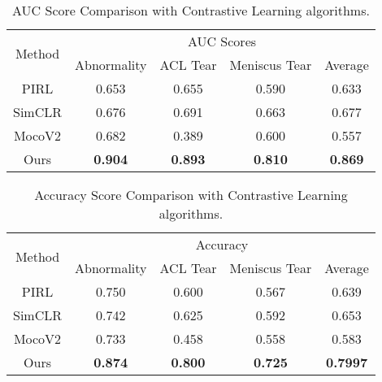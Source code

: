 \documentclass[journal]{IEEEtai}
\begin{document}
\begin{table}[!ht]
    \centering
\centering
    \bgroup
    \caption{AUC Score Comparison with Contrastive Learning algorithms. }
    \label{tab:contr_comp_auc}
    \def\arraystretch{1.5}
    \begin{tabular}{c|c|c|c|c}
    \hline
        \multirow{2}{1.2cm}{\centering Method} & \multicolumn{4}{c}{\centering AUC Scores}\\ \cline{2-5}
        {} & Abnormality & ACL Tear & Meniscus Tear & Average\\  
        \hline \hline
        PIRL \cite{pirl} & 0.653 & 0.655 & 0.590 & 0.633\\ \hline
        SimCLR \cite{simclr} & 0.676 & 0.691 & 0.663 & 0.677\\ \hline
        MocoV2 \cite{mocov2} & 0.682 & 0.389 & 0.600 & 0.557\\ \hline
Ours & \textbf{0.904} & \textbf{0.893} & \textbf{0.810} & \textbf{0.869}\\\hline
         
    \end{tabular}
    \egroup


\end{table}
\quad
\begin{table}[!ht]
\centering
    \bgroup
    \caption{Accuracy Score Comparison with Contrastive Learning algorithms. }
    \label{tab:contr_comp_acc}
    \def\arraystretch{1.5}
    \begin{tabular}{c|c|c|c|c}
    \hline
        \multirow{2}{1.2cm}{\centering Method} & \multicolumn{4}{c}{\centering Accuracy}\\ \cline{2-5}
        {} & Abnormality & ACL Tear & Meniscus Tear & Average\\  
        \hline \hline
        PIRL \cite{pirl} & 0.750 & 0.600 & 0.567 & 0.639\\ \hline
        SimCLR \cite{simclr} & 0.742 & 0.625 & 0.592 & 0.653\\ \hline
        MocoV2 \cite{mocov2} & 0.733 & 0.458 & 0.558 & 0.583\\ \hline
Ours & \textbf{0.874} & \textbf{0.800} & \textbf{0.725} & \textbf{0.7997}\\ \hline
         
    \end{tabular}
    
    \egroup


\end{table}
\end{document}

